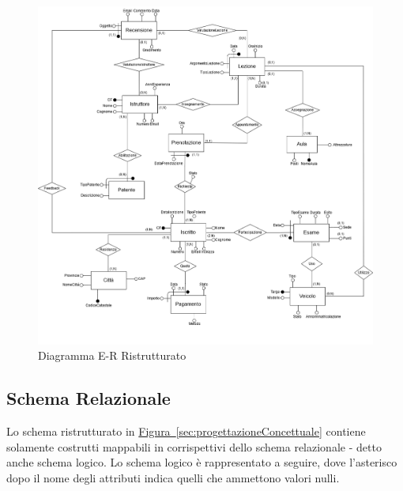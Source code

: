 \documentclass[10pt,twoside]{article}
\begin{document}
{    \newpage

    \begin{figure}[H]        
        \includegraphics[width=1\linewidth]{img/ER_ScuolaGuidaRistrutturato.drawio.png}\centering
        \caption{Diagramma E-R Ristrutturato}
        \label{fig:diagrammaERristrutturato}
    \end{figure}

    \subsection{Schema Relazionale}{
        Lo schema ristrutturato in \hyperref[sec:progettazioneConcettuale]{Figura~\ref*{sec:progettazioneConcettuale}} contiene solamente costrutti mappabili in corrispettivi dello schema relazionale - detto anche schema logico. Lo schema logico è rappresentato a seguire, dove l’asterisco dopo il nome degli attributi indica quelli che ammettono valori nulli.

}}
\end{document}
